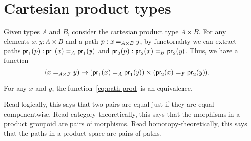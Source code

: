 \section{Cartesian product types}
\label{sec:compute-cartprod}

%
Given types $A$ and $B$, consider the cartesian product type $A \times B$.
For any elements $x,y:A\times B$ and a path $p:\id[A\times B]{x}{y}$, by functoriality we can extract paths $\ap{\proj1}p:\id[A]{\proj1(x)}{\proj1(y)}$ and $\ap{\proj2}p:\id[B]{\proj2(x)}{\proj2(y)}$.
Thus, we have a function
\begin{equation}\label{eq:path-prod}
  (\id[A\times B]{x}{y}) \to (\id[A]{\proj1(x)}{\proj1(y)}) \times (\id[B]{\proj2(x)}{\proj2(y)}).
\end{equation}

\begin{thm}\label{thm:path-prod}
  For any $x$ and $y$, the function~\eqref{eq:path-prod} is an equivalence.
\end{thm}

Read logically, this says that two pairs are equal just if they are equal
componentwise.  Read category-theoretically, this says that the
morphisms in a product groupoid are pairs of morphisms.  Read
homotopy-theoretically, this says that the paths in a product
space are pairs of paths.

